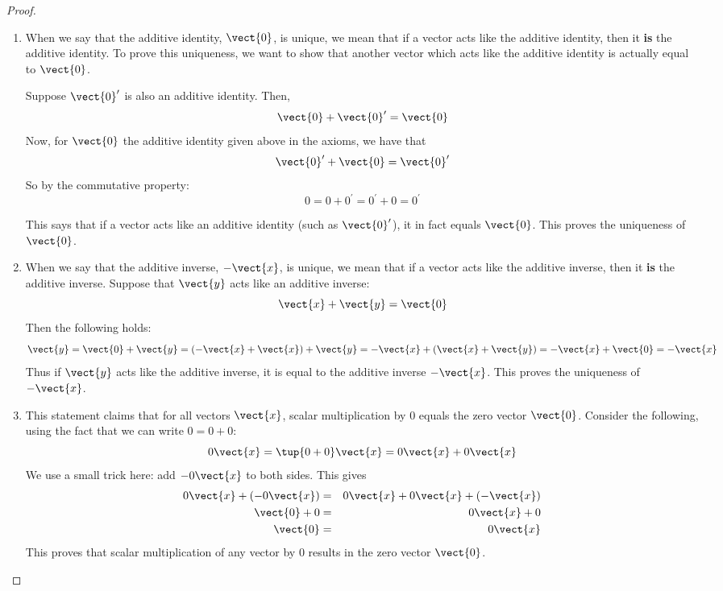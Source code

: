 \begin{proof}
\begin{enumerate}
\item
When we say that the additive identity, $\vect{0}$, is unique, we mean that if a vector acts like the additive identity, then it \textbf{is} the additive identity. To prove this uniqueness, we want to show that another vector which acts like the additive identity is actually equal to $\vect{0}$. 

Suppose $\vect{0}^{\prime }$ is also an additive identity. Then,
\[
\vect{0} + \vect{0}^{\prime} = \vect{0}
\]
Now, for $\vect{0}$ the additive identity given above in the axioms, we have that 
\[
\vect{0}^{\prime} + \vect{0} = \vect{0}^{\prime}
\]
So by the commutative property:
\[
0 = 0 + 0^{\prime} = 0^{\prime} + 0 = 0^{\prime}
\]

This says that if a vector acts like an additive identity (such as $\vect{0}^{\prime}$), it in fact equals $\vect{0}$. This proves the uniqueness of $\vect{0}$.

\item
When we say that the additive inverse, $-\vect{x}$, is unique, we mean that if a vector acts like the additive inverse, then it \textbf{is} the additive inverse. 
Suppose that $\vect{y}$ acts like an additive inverse: 
\begin{equation*}
\vect{x}+\vect{y}=\vect{0}
\end{equation*}
Then the following holds:
\[
\vect{y} = \vect{0} + \vect{y} = (-\vect{x} + \vect{x}) + \vect{y} = -\vect{x} + (\vect{x} + \vect{y}) = -\vect{x} + \vect{0} = -\vect{x}
\]
Thus if $\vect{y}$ acts like the additive inverse, it is equal to the additive
inverse $-\vect{x}$. This proves the uniqueness of $-\vect{x}$. 

\item
This statement claims that for all vectors $\vect{x}$, scalar multiplication by $0$ equals the zero vector $\vect{0}$. Consider the following, using the fact that we can write $0=0+0$:
\begin{equation*}
0\vect{x}=\tup{0+0} \vect{x}=0\vect{x}+0\vect{x}
\end{equation*}
We use a small trick here: add $-0\vect{x}$ to both sides. This gives 
\begin{eqnarray*}
0\vect{x} + (-0\vect{x})&=&0\vect{x}+0\vect{x}+(-\vect{x})\\
\vect{0} + 0 &=&0\vect{x} + 0 \\
\vect{0} &=& 0\vect{x}
\end{eqnarray*}
This proves that scalar multiplication of any vector by $0$ results in the zero vector $\vect{0}$. 


\end{enumerate}
\end{proof}
